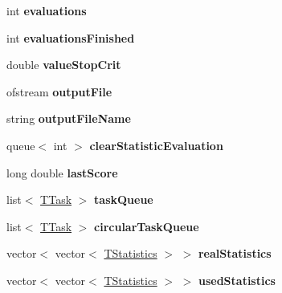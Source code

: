 \begin{DoxyCompactItemize}
\mbox{\label{classCoordinatorIsland_a5d400b189383e2dd48d30c06a5db11d9}} 
int {\bfseries evaluations}
\item 
\mbox{\label{classCoordinatorIsland_a73c591a7ca9ee2723b95ba16b6b188ab}} 
int {\bfseries evaluations\+Finished}
\item 
\mbox{\label{classCoordinatorIsland_acef1ba13b24b23bc78cf4bdf37b8a06d}} 
double {\bfseries value\+Stop\+Crit}
\item 
\mbox{\label{classCoordinatorIsland_a5af2468832745e66e19adc373c2f455c}} 
ofstream {\bfseries output\+File}
\item 
\mbox{\label{classCoordinatorIsland_aaf187f409e882f32c88454974ac8e2b7}} 
string {\bfseries output\+File\+Name}
\item 
\mbox{\label{classCoordinatorIsland_ab3aa5cc5aa936c6c508b4c1be6455cff}} 
queue$<$ int $>$ {\bfseries clear\+Statistic\+Evaluation}
\item 
\mbox{\label{classCoordinatorIsland_ad7a9982659856df1c11922a5eb43c0a6}} 
long double {\bfseries last\+Score}
\item 
\mbox{\label{classCoordinatorIsland_abf6ec05de747be402ed0a4065a6ec336}} 
list$<$ \mbox{\hyperlink{structTTask}{T\+Task}} $>$ {\bfseries task\+Queue}
\item 
\mbox{\label{classCoordinatorIsland_aeb5c8468d17ff38ef1c21f13c1940a75}} 
list$<$ \mbox{\hyperlink{structTTask}{T\+Task}} $>$ {\bfseries circular\+Task\+Queue}
\item 
\mbox{\label{classCoordinatorIsland_a5cb385deb46af49d24b6426af1c387c7}} 
vector$<$ vector$<$ \mbox{\hyperlink{structTStatistics}{T\+Statistics}} $>$ $>$ {\bfseries real\+Statistics}
\item 
\mbox{\label{classCoordinatorIsland_a3b14bb913517f9c0041f948fca42245d}} 
vector$<$ vector$<$ \mbox{\hyperlink{structTStatistics}{T\+Statistics}} $>$ $>$ {\bfseries used\+Statistics}

\end{DoxyCompactItemize}
